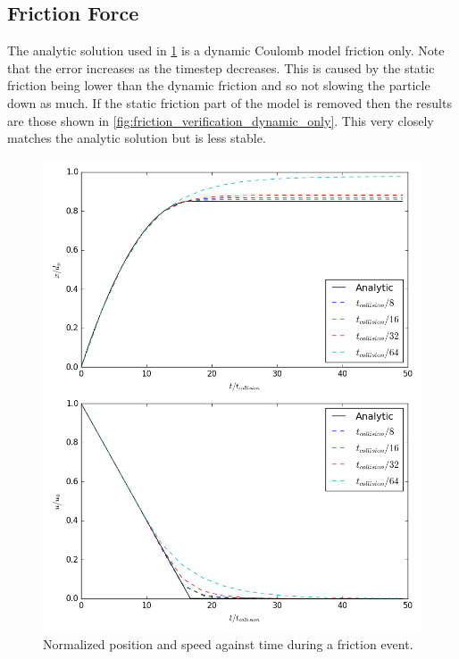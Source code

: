 \documentclass[10pt,a4paper,titlepage]{report}
\begin{document}
\subsection{Friction Force}
The analytic solution used in \ref{fig:friction_verification} is a dynamic Coulomb model friction only. Note that the error increases as the timestep decreases. This is caused by the static friction being lower than the dynamic friction and so not slowing the particle down as much.
If the static friction part of the model is removed then the results are those shown in \ref{fig:friction_verification_dynamic_only}. This very closely matches the analytic solution but is less stable.
\begin{figure}[!htb]
\centering
\includegraphics[scale=0.5]{figures/friction_verification.png}
\caption{Normalized position and speed against time during a friction event.}
\label{fig:friction_verification}
\end{figure}
\end{document}
